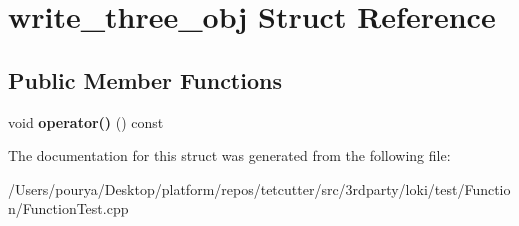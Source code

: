 \hypertarget{structwrite__three__obj}{}\section{write\+\_\+three\+\_\+obj Struct Reference}
\label{structwrite__three__obj}
\subsection*{Public Member Functions}
\begin{DoxyCompactItemize}
\item 
\hypertarget{structwrite__three__obj_aaae8677236d9d5477227b4e9dec490fc}{}void {\bfseries operator()} () const \label{structwrite__three__obj_aaae8677236d9d5477227b4e9dec490fc}

\end{DoxyCompactItemize}


The documentation for this struct was generated from the following file\+:\begin{DoxyCompactItemize}
\item 
/\+Users/pourya/\+Desktop/platform/repos/tetcutter/src/3rdparty/loki/test/\+Function/Function\+Test.\+cpp\end{DoxyCompactItemize}
